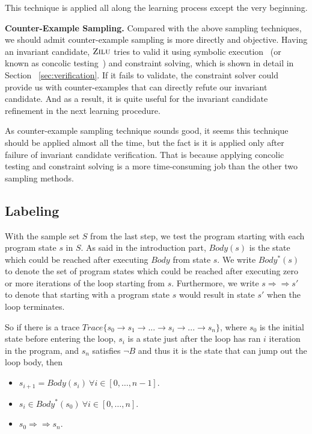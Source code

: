 This technique is applied all along the learning process except the very beginning.

\medskip\noindent
\textbf{Counter-Example Sampling.}
Compared with the above sampling techniques, we should admit counter-example sampling is more directly and objective.  
Having an invariant candidate, $\textsc{Zilu}$ tries to valid it using symbolic execution~\cite{king1976symbolic}\cite{khurshid2003generalized}
(or known as concolic testing~\cite{sen2007concolic}) and constraint solving,
which is shown in detail in Section ~\ref{sec:verification}.
If it fails to validate, the constraint solver could provide us with counter-examples that can directly refute our invariant candidate.
And as a result, it is quite useful for the invariant candidate refinement in the next learning procedure.

As counter-example sampling technique sounds good, it seems this technique should be applied almost all the time, 
but the fact is it is applied only after failure of invariant candidate verification.
That is because applying concolic testing and constraint solving is a more time-consuming job than the other two sampling methods.


\subsection {Labeling}
With the sample set $S$ from the last step, we test the program starting with each program state $s$ in $S$. 
As said in the introduction part, $Body(s)$ is the state which could be reached after executing $Body$ from state $s$.
We write $Body^*(s)$ to denote the set of program states which could be reached after executing zero or more iterations of the loop starting from $s$.
Furthermore, we write $s \Rightarrow\Rightarrow s'$ to denote that starting with a program state $s$ would result in state $s'$ when the loop terminates. 

So if there is a trace $Trace\{s_0 \to s_1 \to ...\to s_i \to ... \to s_n\}$, 
where $s_0$ is the initial state before entering the loop, 
$s_i$ is a state just after the loop has ran $i$ iteration in the program,
and $s_n$ satisfies $\neg B$ and thus it is the state that can jump out the loop body,
then 
\begin{itemize}
\item $s_{i+1} = Body(s_i)\ \forall i \in [0, \ldots, n-1]$.
\item $s_{i} \in Body^*(s_0)\ \forall i \in [0, \ldots, n]$.
\item $s_{0} \Rightarrow\Rightarrow s_{n}$.
\end{itemize}



